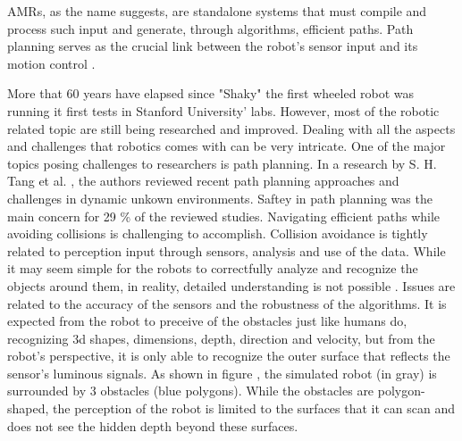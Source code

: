 AMRs, as the name suggests, are 
standalone systems that must compile and process such input and generate, through algorithms, 
efficient paths. Path planning serves as the crucial 
link between the robot’s sensor input and its motion control \cite{R10}.


More that 60 years have elapsed since "Shaky" the first wheeled robot was running it first tests
in Stanford University' labs. However, most of the robotic related topic are still being researched and improved.
Dealing with all the aspects and challenges that robotics comes with can be very intricate. One of the major 
topics posing challenges to researchers is path planning. 
In a research by S. H. Tang et al. \cite{R20}, the authors reviewed recent path planning approaches and challenges
in dynamic unkown environments. 
Saftey in path planning was the main concern for 29 \% of the reviewed studies. Navigating efficient 
paths while avoiding collisions is challenging to accomplish. Collision avoidance is tightly related to perception 
input through sensors, analysis and use of the data. While it may seem simple for the robots to correctfully analyze 
and recognize the objects around them, in reality, detailed understanding is not possible \cite{R21}. Issues are 
related to the accuracy of the sensors and the robustness of the algorithms. 
It is expected from the robot to 
preceive of the obstacles just like humans do, recognizing 3d shapes, dimensions, depth, direction and velocity, 
but from the 
robot's perspective, it is only able to recognize the outer surface that reflects the sensor's luminous signals. As shown in
figure , the simulated robot (in gray) is surrounded by 3 obstacles (blue polygons).
While the obstacles are polygon-shaped, the perception of the robot is limited to the surfaces that 
it can scan and does not see the hidden depth beyond these surfaces.

